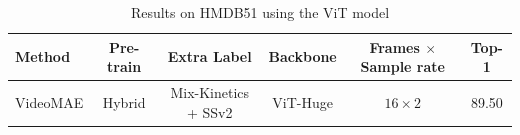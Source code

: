 \begin{table}[t]
\centering
\small
\caption{Results on HMDB51 using the ViT model}
  \begin{tabular}{lccccc}
    \toprule
     Method & Pre-train & Extra Label & Backbone & Frames $\times$ Sample rate & Top-1\\
    \midrule
     VideoMAE & Hybrid & Mix-Kinetics + SSv2 & ViT-Huge & $16\times 2$& 89.50 \\
    \bottomrule
  \end{tabular}
\label{tab:videmae-hmdb51}
\end{table}
